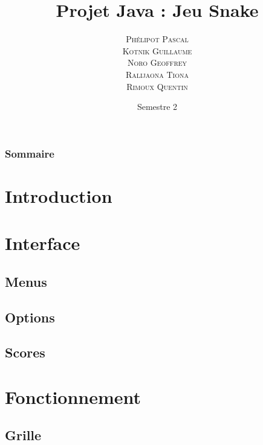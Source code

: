 \documentclass{beamer}
\author[\textsc{Phélipot\and Kotnik\and Noro\and Tiona\and Rimoux}]{\textsc{Phélipot Pascal\\ Kotnik Guillaume\\ Noro Geoffrey\\ Ralijaona Tiona\\ Rimoux Quentin}}
\title[Jeu Snake]{Projet Java : Jeu Snake}
\date{Semestre 2}
\begin{document}
\begin{frame}
\maketitle
\end{frame}

\begin{frame}
\frametitle{Sommaire}

\tableofcontents	
\end{frame}

\section{Introduction}
\begin{frame}
\frametitle{\insertsection}

\end{frame}

\section{Interface}
\subsection{Menus}
\begin{frame}
\frametitle{\insertsubsection}
\framesubtitle{\insertsection}

\end{frame}
\subsection{Options}
\begin{frame}
\frametitle{\insertsubsection}
\framesubtitle{\insertsection}

\end{frame}
\subsection{Scores}
\begin{frame}
\frametitle{\insertsubsection}
\framesubtitle{\insertsection}

\end{frame}

\section{Fonctionnement}
\subsection{Grille}
\end{document}
